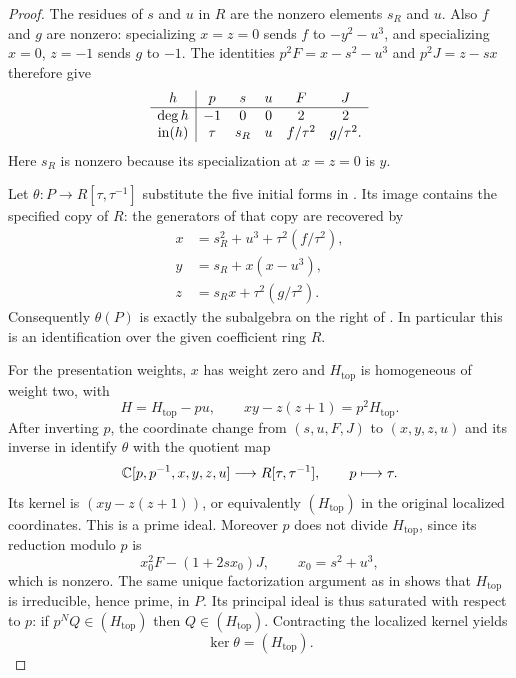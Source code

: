 \begin{proof}
The residues of $s$ and $u$ in $R$ are the nonzero elements $s_R$
and $u$.  Also $f$ and $g$ are nonzero: specializing $x=z=0$ sends
$f$ to $-y^2-u^3$, and specializing $x=0$, $z=-1$ sends $g$ to
$-1$.  The identities $p^2F=x-s^2-u^3$ and $p^2J=z-sx$ therefore
give
\begin{equation}\label{deg:initial-generators}
 \begin{array}{c|ccccc}
 h&p&s&u&F&J\\ \hline
 \deg h&-1&0&0&2&2\\
 \operatorname{in}(h)&\tau&s_R&u&f/\tau^2&g/\tau^2.
 \end{array}
\end{equation}
Here $s_R$ is nonzero because its specialization at $x=z=0$ is $y$.

Let $\theta:P\to R[\tau,\tau^{-1}]$ substitute the five initial
forms in .  Its image contains the
specified copy of $R$: the generators of that copy are recovered by
\begin{equation}\label{deg:recover-R}
 \begin{split}
 x&=s_R^2+u^3+\tau^2(f/\tau^2),\\
 y&=s_R+x(x-u^3),\\
 z&=s_Rx+\tau^2(g/\tau^2).
 \end{split}
\end{equation}
Consequently $\theta(P)$ is exactly the subalgebra on the right of
.  In particular this is an identification over the
given coefficient ring $R$.

For the presentation weights, $x$ has weight zero and
$H_{\mathrm{top}}$ is homogeneous of weight two, with
\begin{equation}\label{deg:top-relation}
 H=H_{\mathrm{top}}-pu,
 \qquad xy-z(z+1)=p^2H_{\mathrm{top}}.
\end{equation}
After inverting $p$, the coordinate change from
$(s,u,F,J)$ to $(x,y,z,u)$ and its inverse in
 identify $\theta$ with the quotient map
\[
 \mathbb C[p,p^{-1},x,y,z,u]\longrightarrow R[\tau,\tau^{-1}],
 \qquad p\longmapsto\tau.
\]
Its kernel is $(xy-z(z+1))$, or equivalently
$(H_{\mathrm{top}})$ in the original localized coordinates.
This is a prime ideal.  Moreover $p$ does not divide
$H_{\mathrm{top}}$, since its reduction modulo $p$ is
\[
 x_0^2F-(1+2sx_0)J,\qquad x_0=s^2+u^3,
\]
which is nonzero.  The same unique factorization argument as in
 shows that $H_{\mathrm{top}}$ is irreducible,
hence prime, in $P$.  Its principal ideal is thus saturated with
respect to $p$: if $p^NQ\in(H_{\mathrm{top}})$ then
$Q\in(H_{\mathrm{top}})$.  Contracting the localized kernel yields
\begin{equation}\label{deg:kernel}
 \ker\theta=(H_{\mathrm{top}}).
\end{equation}


\end{proof}
